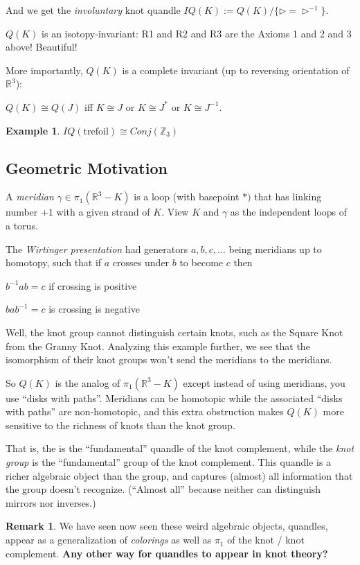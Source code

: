 \documentclass[11pt]{article}
\newcommand{\Z}{\mathbb{Z}}
\newcommand{\R}{\mathbb{R}}
\theoremstyle{plain}
\theoremstyle{definition}
\newtheorem{remark}{Remark}
\newtheorem{ex}{Example}
\begin{document}
And we get the \textit{involuntary} knot quandle $IQ(K):=Q(K)/\lbrace\rhd=\rhd^{-1}\rbrace$.

\bigskip
$Q(K)$ is an isotopy-invariant: R1 and R2 and R3 are the Axioms 1 and 2 and 3 above! Beautiful!

\bigskip
More importantly, $Q(K)$ is a complete invariant (up to reversing orientation of $\R^3$):

\indent\indent$Q(K)\cong Q(J)$ iff $K\cong J$ or $K\cong J^\ast$ or $K\cong J^{-1}$.

\begin{ex}
$IQ(\text{trefoil})\cong Conj(\Z_3)$
\end{ex}

\subsection{Geometric Motivation}

A \textit{meridian} $\gamma\in\pi_1(\R^3-K)$ is a loop (with basepoint $\ast)$ that has linking number $+1$ with a given strand of $K$. View $K$ and $\gamma$ as the independent loops of a torus.

The \textit{Wirtinger presentation} had generators $a,b,c,\ldots$ being meridians up to homotopy, such that if $a$ crosses under $b$ to become $c$ then

$b^{-1}ab=c$ if crossing is positive

$bab^{-1}=c$ is crossing is negative

Well, the knot group cannot distinguish certain knots, such as the Square Knot from the Granny Knot. Analyzing this example further, we see that the isomorphism of their knot groups won't send the meridians to the meridians.

\bigskip
So $Q(K)$ is the analog of $\pi_1(\R^3-K)$ except instead of using meridians, you use ``disks with paths''. Meridians can be homotopic while the associated ``disks with paths'' are non-homotopic, and this extra obstruction makes $Q(K)$ more sensitive to the richness of knots than the knot group.

That is, the  is the ``fundamental'' quandle of the knot complement, while the \textit{knot group} is the ``fundamental'' group of the knot complement. This quandle is a richer algebraic object than the group, and captures (almost) all information that the group doesn't recognize. (``Almost all'' because neither can distinguish mirrors nor inverses.)

\begin{remark}
We have seen now seen these weird algebraic objects, quandles, appear as a generalization of \textit{colorings} as well as $\pi_1$ of the knot / knot complement. \textbf{Any other way for quandles to appear in knot theory?}
\end{remark}
\end{document}
